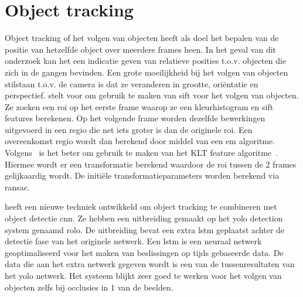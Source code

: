     \section{Object tracking}
        Object tracking of het volgen van objecten heeft als doel het bepalen van de positie van hetzelfde object over meerdere frames heen. In het geval van dit onderzoek kan het een indicatie geven van relatieve posities t.o.v. objecten die zich in de gangen bevinden.
        Een grote moeilijkheid bij het volgen van objecten stilstaan t.o.v. de camera is dat ze veranderen in grootte, ori\"{e}ntatie en perspectief.
        \cite{Zhou2009} stelt voor om gebruik te maken van \gls{sift} voor het volgen van objecten. Ze zoeken een \gls{roi} op het eerste frame waarop ze een kleurhistogram en \gls{sift} features berekenen.
        Op het volgende frame worden dezelfde bewerkingen uitgevoerd in een regio die net iets groter is dan de originele \gls{roi}. Een overeenkomst regio wordt dan berekend door middel van een \gls{em} algoritme.
        Volgens~\cite{Baheti2016} is het beter om gebruik te maken van het KLT feature algoritme~\cite{tomasi1991detection}. Hiermee wordt er een transformatie berekend waardoor de \gls{roi} tussen de 2 frames gelijkaardig wordt. De initi\"{e}le transformatieparameters worden berekend via \gls{ransac}.

        \cite{Ning2017} heeft een nieuwe techniek ontwikkeld om object tracking te combineren met object detectie \gls{cnn}. Ze hebben een uitbreiding gemaakt op het \gls{yolo} detection system genaamd \gls{rolo}.
        De uitbreiding bevat een extra \gls{lstm} geplaatst achter de detectie fase van het originele netwerk. Een \gls{lstm} is een neuraal netwerk geoptimaliseerd voor het maken van beslissingen op tijds gebaseerde data.
        De data die aan het extra netwerk gegeven wordt is een van de tussenresultaten van het \gls{yolo} netwerk.
        Het systeem blijkt zeer goed te werken voor het volgen van objecten zelfs bij occlusies in 1 van de beelden. 

